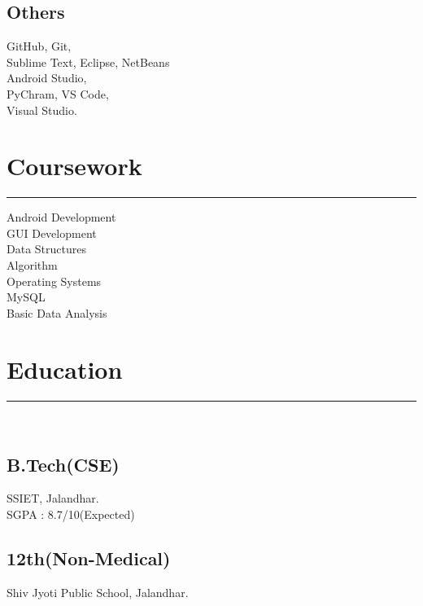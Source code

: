 \documentclass[]{sapna-resume}
\begin{document}
\begin{minipage}[t]{0.33\textwidth}
\subsection{Others}
GitHub, Git,\\Sublime Text, Eclipse, NetBeans\\
Android Studio,\\PyChram, VS Code, \\Visual Studio.
\sectionsep
\section{Coursework}
\noindent\rule{5cm}{0.4pt}

Android Development\\
GUI Development\\
Data Structures\\
Algorithm\\
Operating Systems\\
MySQL\\
Basic Data Analysis
\sectionsep
\section{Education} 
\noindent\rule{5cm}{0.4pt}\\
\subsection{B.Tech(CSE)}
SSIET, Jalandhar. \\
SGPA : 8.7/10(Expected)\\
\vspace{8pt}
\subsection{12th(Non-Medical)}
Shiv Jyoti Public School, Jalandhar.\\
\vspace{8pt}
\sectionsep
%
%

\end{minipage} 
\hfill
\end{document}
